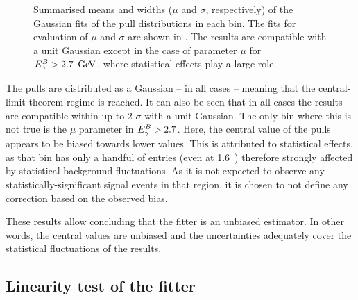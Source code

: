 \begin{figure}[htbp!]
    \centering
    \caption{\label{fig:mean_sigma_pulls}Summarised means and widths ($\mu$ and $\sigma$, respectively) of the Gaussian fits of
    the pull distributions in each \EB bin.
    The fits for evaluation of $\mu$ and $\sigma$ are shown in .
    The results are compatible with a unit Gaussian except in the case of parameter $\mu$ for ${E^B_{\gamma}}>2.7~\mathrm{\,Ge\kern -0.1em V}$, where statistical effects play a large role.
    }
\end{figure}

The pulls are distributed as a Gaussian -- in all cases -- meaning that the central-limit theorem regime is reached.
It can also be seen that in all cases the results are compatible within up to 2 $\sigma$ with a unit Gaussian.
The only \EB bin where this is not true is the $\mu$ parameter in ${E^B_{\gamma}}>2.7$.
Here, the central value of the pulls appears to be biased towards lower values.
This is attributed to statistical effects, as that bin has only a handful of entries (even at 1.6~\invab) therefore strongly affected by statistical background fluctuations.
As it is not expected to observe any statistically-significant signal events in that region, it is chosen to not define any correction based on the observed bias.

These results allow concluding that the \Mbc fitter is an unbiased estimator.
In other words, the central values are unbiased and the uncertainties adequately cover the statistical fluctuations of the results.

\subsection{Linearity test of the \texorpdfstring{\Mbc}{Mbc} fitter}\label{sec:linearity_test}

